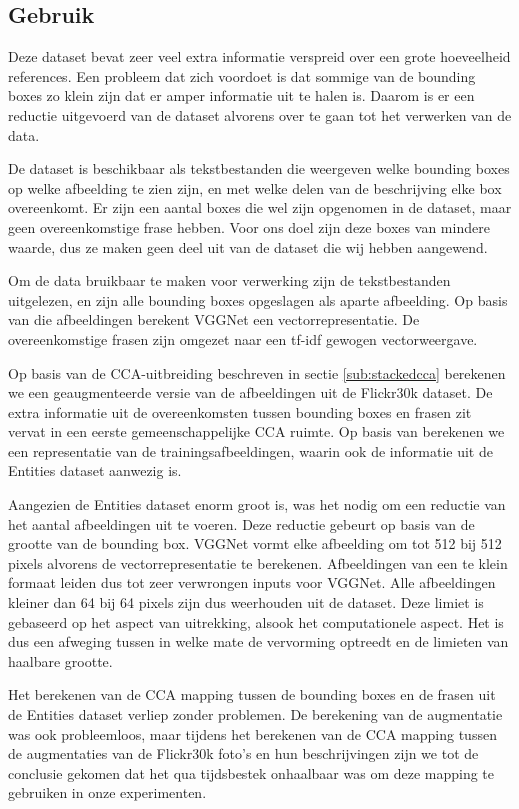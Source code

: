\subsection{Gebruik}
\label{sub:Gebruik}
Deze dataset bevat zeer veel extra informatie verspreid over een grote hoeveelheid references. Een probleem dat zich voordoet is dat sommige van de bounding boxes zo klein zijn dat er amper informatie uit te halen is. Daarom is er een reductie uitgevoerd van de dataset alvorens over te gaan tot het verwerken van de data. 

De dataset is beschikbaar als tekstbestanden die weergeven welke bounding boxes op welke afbeelding te zien zijn, en met welke delen van de beschrijving elke box overeenkomt. Er zijn een aantal boxes die wel zijn opgenomen in de dataset, maar geen overeenkomstige frase hebben. Voor ons doel zijn deze boxes van mindere waarde, dus ze maken geen deel uit van de dataset die wij hebben aangewend. 

Om de data bruikbaar te maken voor verwerking zijn de tekstbestanden uitgelezen, en zijn alle bounding boxes opgeslagen als aparte afbeelding. Op basis van die afbeeldingen berekent VGGNet een vectorrepresentatie. De overeenkomstige frasen zijn omgezet naar een tf-idf gewogen vectorweergave. 

Op basis van de CCA-uitbreiding beschreven in sectie \ref{sub:stackedcca} berekenen we een geaugmenteerde versie van de afbeeldingen uit de Flickr30k dataset. De extra informatie uit de overeenkomsten tussen bounding boxes en frasen zit vervat in een eerste gemeenschappelijke CCA ruimte. Op basis van  berekenen we een representatie van de trainingsafbeeldingen, waarin ook de informatie uit de Entities dataset aanwezig is.

Aangezien de Entities dataset enorm groot is, was het nodig om een reductie van het aantal afbeeldingen uit te voeren. Deze reductie gebeurt op basis van de grootte van de bounding box. VGGNet vormt elke afbeelding om tot 512 bij 512 pixels alvorens de vectorrepresentatie te berekenen. Afbeeldingen van een te klein formaat leiden dus tot zeer verwrongen inputs voor VGGNet. Alle afbeeldingen kleiner dan 64 bij 64 pixels zijn dus weerhouden uit de dataset. Deze limiet is gebaseerd op het aspect van uitrekking, alsook het computationele aspect. Het is dus een afweging tussen in welke mate de vervorming optreedt en de limieten van haalbare grootte.

Het berekenen van de CCA mapping tussen de bounding boxes en de frasen uit de Entities dataset verliep zonder problemen. De berekening van de augmentatie was ook probleemloos, maar tijdens het berekenen van de CCA mapping tussen de augmentaties van de Flickr30k foto's en hun beschrijvingen zijn we tot de conclusie gekomen dat het qua tijdsbestek onhaalbaar was om deze mapping te gebruiken in onze experimenten. 


